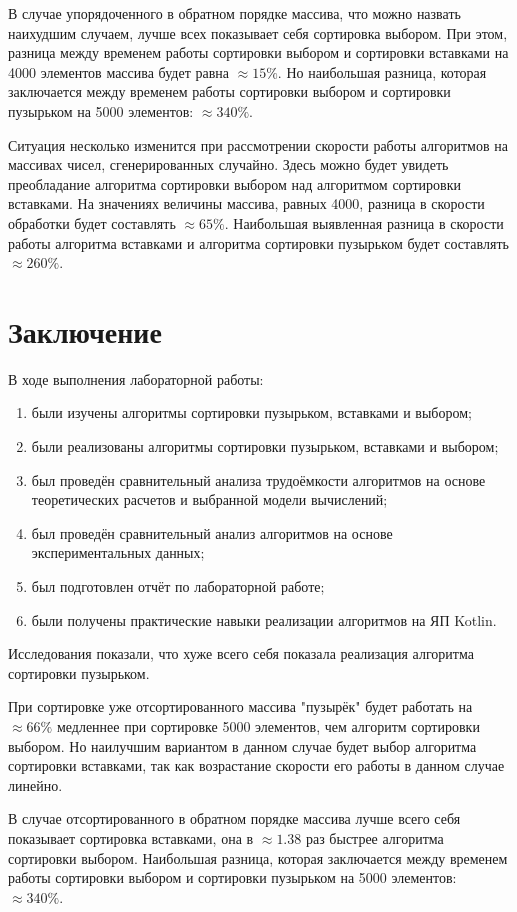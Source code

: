 \documentclass[12pt]{report}
\begin{document}
В случае упорядоченного в обратном порядке массива, что можно назвать наихудшим случаем, лучше всех показывает себя сортировка выбором. При этом, разница между временем работы сортировки выбором и сортировки вставками на 4000 элементов массива будет равна $\approx 15\%$. Но наибольшая разница, которая заключается между временем работы сортировки выбором и сортировки пузырьком на 5000 элементов: $\approx 340\%$.

Ситуация несколько изменится при рассмотрении скорости работы алгоритмов на массивах чисел, сгенерированных случайно. Здесь можно будет увидеть преобладание алгоритма сортировки выбором над алгоритмом сортировки вставками. На значениях величины массива, равных 4000, разница в скорости обработки будет составлять $\approx 65\%$. Наибольшая выявленная разница в скорости работы алгоритма вставками и алгоритма сортировки пузырьком будет составлять $\approx 260\%$.

\chapter*{Заключение}
В ходе выполнения лабораторной работы:
\begin{enumerate}
\item были изучены алгоритмы сортировки пузырьком, вставками и выбором;
\item были реализованы алгоритмы сортировки пузырьком, вставками и выбором;
\item был проведён сравнительный анализа трудоёмкости алгоритмов на основе теоретических расчетов и выбранной модели вычислений;
\item был проведён сравнительный анализ алгоритмов на основе экспериментальных данных;
\item был подготовлен отчёт по лабораторной работе;
\item были получены практические навыки реализации алгоритмов на ЯП Kotlin.
\end{enumerate}

Исследования показали, что хуже всего себя показала реализация алгоритма сортировки пузырьком.

При сортировке уже отсортированного массива "пузырёк" будет работать на $\approx 66\%$ медленнее при сортировке 5000 элементов, чем алгоритм сортировки выбором. Но наилучшим вариантом в данном случае будет выбор алгоритма сортировки вставками, так как возрастание скорости его работы в данном случае линейно.

В случае отсортированного в обратном порядке массива лучше всего себя показывает сортировка вставками, она в $\approx 1.38$ раз быстрее алгоритма сортировки выбором. Наибольшая разница, которая заключается между временем работы сортировки выбором и сортировки пузырьком на 5000 элементов: $\approx 340\%$.
\end{document}
